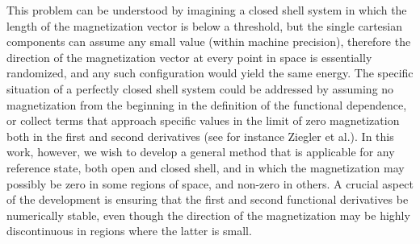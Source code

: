 \documentclass[12pt]{article}
\begin{document}
This problem can be understood by imagining a closed shell system in which the length of the magnetization vector is below a threshold, but the single cartesian components can assume any small value (within machine precision), therefore the direction of the magnetization vector at every point in space is essentially randomized,
and any such configuration would yield the same energy.
The specific situation of a perfectly closed shell system could be addressed by assuming no magnetization from the beginning in the definition of the functional dependence, or collect terms that approach specific values in the limit of zero magnetization both in the first and second derivatives (see for instance Ziegler et al.\cite{Ziegler04_12191,Baerends05_204103,Ziegler07_5270}).
In this work, however, we wish to develop a general method that is applicable for any reference state, both open and closed shell, and in which the magnetization may possibly be zero in some regions of space, and non-zero in others.
A crucial aspect of the development is ensuring that the first and second functional derivatives be numerically stable, even though the direction of the magnetization may be highly discontinuous in regions where the latter is small.
\end{document}
